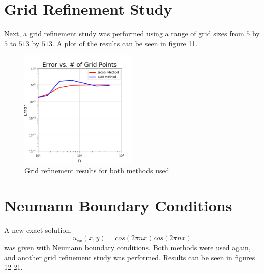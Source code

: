 \documentclass[12pt,a4paper]{report}
\begin{document}
			\pagebreak
			
	\section{Grid Refinement Study}
		Next, a grid refinement study was performed using a range of grid sizes from $5$ by
		$5$ to $513$ by $513$.  A plot of the results can be seen in figure 11.
		
		\begin{figure}[h]
			\centering
				\includegraphics[width=0.5\textwidth]{grid_refine.png}
				\caption{Grid refinement results for both methods used}
		\end{figure}
		
		\pagebreak
	\section{Neumann Boundary Conditions}
		A new exact solution,
		$$u_{ex}\left(x,y\right) = cos{\left(2\pi nx\right)cos\left(2\pi nx\right)}$$
		was given with Neumann boundary conditions.  Both methods were used again, and another grid
		refinement study was performed.  Results can be seen in figures 12-21.
		
\end{document}
